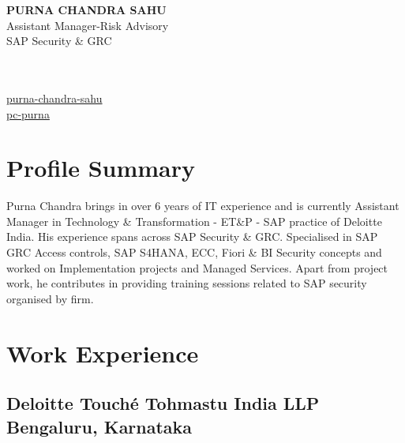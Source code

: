 \documentclass[10pt]{article}
\begin{document}
\begin{center}
	\begin{minipage}{0.5\textwidth}
		{\bfseries \Large
			PURNA CHANDRA SAHU %
		} \\ 
		Assistant Manager-Risk Advisory \\ %
		SAP Security \& GRC

	\end{minipage} \hfill
	\begin{minipage}{0.3\textwidth}
		\footnotesize \raggedright
			\\
			 \\
			 \href {linkedin.com/in/purna-chandra-sahu}{purna-chandra-sahu} \\
			  \href {github.com/pc-purna}{pc-purna} \\
	\end{minipage}
\end{center}

\section{Profile Summary}
\begin{minipage}{1.0\textwidth}
	
	\small 
	{
		Purna Chandra brings in over 6 years of IT experience and is currently Assistant Manager 
	in Technology \& Transformation - ET\&P - SAP practice of Deloitte India. His experience spans across SAP Security \& GRC. 
	Specialised in SAP GRC Access controls, SAP S4HANA, ECC, Fiori \& BI Security concepts and 
	worked on Implementation projects and Managed Services. Apart from project work, he contributes in providing 
	training sessions related to SAP security organised by firm.
	}
\end{minipage}



\section{Work Experience}
\subsection{Deloitte Touché Tohmastu India LLP \hfill \normalfont Bengaluru, Karnataka}
\end{document}

